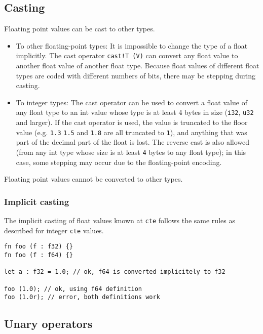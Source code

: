 \subsection{Casting}
\label{sec:org9eacb07}

Floating point values can be cast to other types.

\begin{itemize}
\item To other floating-point types: It is impossible to change the type of a
  float implicitly. The cast operator \texttt{cast!T (V)} can convert any float
  value to another float value of another float type. Because float values of
  different float types are coded with different numbers of bits, there may be
  stepping during casting.

\item To integer types: The cast operator can be used to convert a float value
  of any float type to an int value whose type is at least 4 bytes in size
  (\texttt{i32}, \texttt{u32} and larger). If the cast operator is used, the
  value is truncated to the floor value (e.g. \texttt{1.3} \texttt{1.5} and
  \texttt{1.8} are all truncated to \texttt{1}), and anything that was part of
  the decimal part of the float is lost. The reverse cast is also allowed (from
  any int type whose size is at least \texttt{4} bytes to any float type); in
  this case, some stepping may occur due to the floating-point encoding.

\end{itemize}

Floating point values cannot be converted to other types.
\subsubsection{Implicit casting}

The implicit casting of float values known at \texttt{cte} follows the same
rules as described for integer \texttt{cte} values.

\begin{lstlisting}[style=coloredverbatim]
fn foo (f : f32) {}
fn foo (f : f64) {}

let a : f32 = 1.0; // ok, f64 is converted implicitely to f32

foo (1.0); // ok, using f64 definition
foo (1.0r); // error, both definitions work
\end{lstlisting}

\subsection{Unary operators}
\label{sec:org30770bf}

